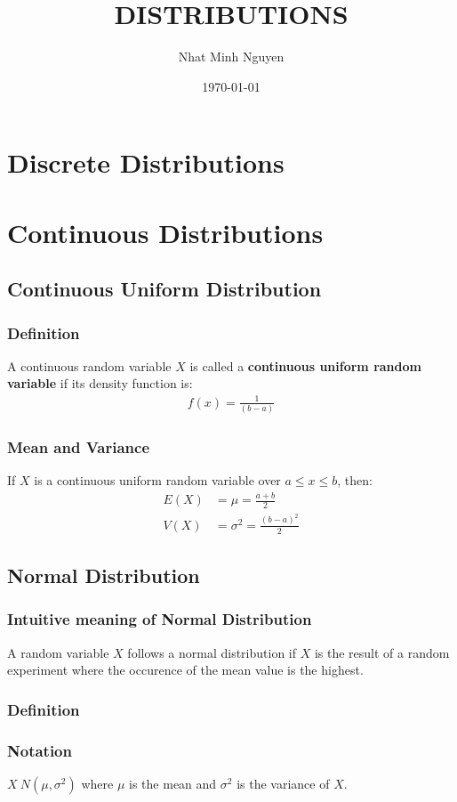\documentclass[11pt]{article}
\author{Nhat Minh Nguyen}
\date{\today}
\title{DISTRIBUTIONS}
\begin{document}
\maketitle
\tableofcontents


\section{Discrete Distributions}
\label{sec:org0c8d10b}

\section{Continuous Distributions}
\label{sec:orga9ce994}

\subsection{Continuous Uniform Distribution}
\label{sec:orgb0868a9}
\subsubsection{Definition}
\label{sec:org9cfe75c}
A continuous random variable \(X\) is called a \textbf{continuous uniform random variable} if its density function is:
\begin{align*}
    f(x) = \frac{1}{(b - a)}
\end{align*}

\subsubsection{Mean and Variance}
\label{sec:org51adb07}
If \(X\) is a continuous uniform random variable over \(a \leq x \leq b\), then:
\begin{align*}
    E(X) &= \mu  = \frac{a + b}{2} \\
    V(X) &= \sigma^2  = \frac{(b - a)^2}{2}
\end{align*}


\subsection{Normal Distribution}
\label{sec:orgc4b331b}
\subsubsection{Intuitive meaning of Normal Distribution}
\label{sec:org0dfba59}
A random variable \(X\) follows a normal distribution if \(X\) is the result of a random experiment where the occurence of the mean value is the highest.
\subsubsection{Definition}
\label{sec:org5a85294}
\subsubsection{Notation}
\label{sec:org6e4d66f}
\(X ~ N(\mu, \sigma^2)\)
where \(\mu\) is the mean and \(\sigma^2\) is the variance of \(X\).
\end{document}
